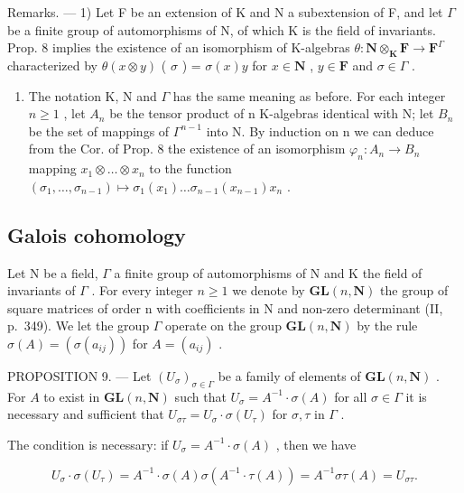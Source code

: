 Remarks. --- 1) Let F be an extension of K and N a subextension of F, and let \(\Gamma\) be a finite group of automorphisms of N, of which K is the field of invariants. Prop. 8 implies the existence of an isomorphism of K-algebras \(\theta: \mathbf{N} \otimes_{\mathbf{K}} \mathbf{F} \to \mathbf{F}^{\Gamma}\) characterized by \(\theta(x \otimes y)\) ( \(\sigma\) ) = \(\sigma(x)y\) for \(x \in \mathbf{N}\) , \(y \in \mathbf{F}\) and \(\sigma \in \Gamma\) .

\begin{enumerate}
\def\labelenumi{\arabic{enumi})}
\setcounter{enumi}{1}
\tightlist
\item
  The notation K, N and \(\Gamma\) has the same meaning as before. For each integer \(n \geqslant 1\) , let \(A_{n}\) be the tensor product of n K-algebras identical with N; let \(B_{n}\) be the set of mappings of \(\Gamma^{n-1}\) into N. By induction on n we can deduce from the Cor. of Prop. 8 the existence of an isomorphism \(\varphi_{n}: A_{n} \to B_{n}\) mapping \(x_{1} \otimes \ldots \otimes x_{n}\) to the function \((\sigma_{1}, \ldots, \sigma_{n-1}) \mapsto \sigma_{1}(x_{1}) \ldots \sigma_{n-1}(x_{n-1}) x_{n}\) .
\end{enumerate}

\subsection{Galois cohomology}

Let N be a field, \(\Gamma\) a finite group of automorphisms of N and K the field of invariants of \(\Gamma\) . For every integer \(n \geqslant 1\) we denote by \(\mathbf{GL}(n, \mathbf{N})\) the group of square matrices of order n with coefficients in N and non-zero determinant (II, p.~349). We let the group \(\Gamma\) operate on the group \(\mathbf{GL}(n, \mathbf{N})\) by the rule \(\sigma(A) = (\sigma(a_{ij}))\) for \(A = (a_{ij})\) .

PROPOSITION 9. --- Let \((U_{\sigma})_{\sigma \in \Gamma}\) be a family of elements of \(\mathbf{GL}(n, \mathbf{N})\) . For \(A\) to exist in \(\mathbf{GL}(n, \mathbf{N})\) such that \(U_{\sigma} = A^{-1} \cdot \sigma(A)\) for all \(\sigma \in \Gamma\) it is necessary and sufficient that \(U_{\sigma\tau} = U_{\sigma} \cdot \sigma(U_{\tau})\) for \(\sigma, \tau\) in \(\Gamma\) .

The condition is necessary: if \(U_{\sigma} = A^{-1} \cdot \sigma(A)\) , then we have

\[
U _ {\sigma} \cdot \sigma (U _ {\tau}) = A ^ {- 1} \cdot \sigma (A) \sigma (A ^ {- 1} \cdot \tau (A)) = A ^ {- 1} \sigma \tau (A) = U _ {\sigma \tau}.
\]

